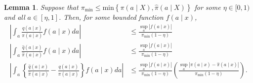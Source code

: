 \documentclass[11pt,twoside]{article}
\newtheorem{lemma}{Lemma}
\theoremstyle{definition}
\theoremstyle{remark}
\begin{document}
\begin{lemma} \label{sup_norm_lemma}
Suppose that $\pi_{\min} \leq \text{min}\left\{ \pi(a \mid X), \widehat{\pi}(a \mid X) \right\}$ for some $\eta \in [0, 1)$ and all $a \in  [\eta, 1]$. Then, for some bounded function $f(a \mid x)$,
\begin{align*}
\left| \int_a \frac{q(a \mid x)}{\pi(a \mid x)} f(a \mid x) da \right| &\leq  \frac{ \sup_a | f(a \mid x) |}{\pi_{\min}(1 - \eta)} \\
\left| \int_a \frac{\widehat{q}(a \mid x)}{\widehat\pi(a \mid x)} f(a \mid x)  da \right| &\leq  \frac{ \sup_a | f(a \mid x) |}{\pi_{\min}(1 - \eta)} \\
\left| \int_a \left\{ \frac{\widehat{q}(a \mid x)}{\widehat\pi(a \mid x)} - \frac{q(a \mid x)}{\pi(a \mid x)} \right\} f(a \mid x)  da \right| &\leq \frac{ \sup_a | f(a \mid x) |}{\pi_{\min}(1 - \eta)} \left( \frac{ \sup_a | \pi(a \mid x) - \widehat\pi(a \mid x) |}{\pi_{\min}(1 - \eta)}\right) .
\end{align*}
\end{lemma}

\bigskip
\end{document}
